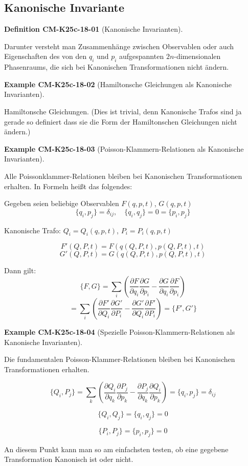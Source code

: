 \documentclass[10pt, letterpaper]{article}
\newcommand{\CustomHeading}[3]{%
  \par\medskip\noindent%
  \textbf{#1 #2} \textnormal{(#3)}.\enskip%
}
\newenvironment{DEF}[2]{\CustomHeading{Definition}{#1}{#2}}{}
\newenvironment{EXA}[2]{\CustomHeading{Example}{#1}{#2}}{}
\begin{document}
\subsection{Kanonische Invariante}

\begin{DEF}{CM-K25c-18-01}{Kanonische Invarianten}
Darunter versteht man Zusammenhänge zwischen Observablen oder auch Eigenschaften des von den $q_i$ und $p_i$ aufgespannten $2n$-dimensionalen Phasenraums, die sich bei Kanonischen Transformationen nicht ändern.
\end{DEF}

\begin{EXA}{CM-K25c-18-02}{Hamiltonsche Gleichungen als Kanonische Invarianten}
Hamiltonsche Gleichungen. (Dies ist trivial, denn Kanonische Trafos sind ja gerade so definiert dass sie die Form der Hamiltonschen Gleichungen nicht ändern.)
\end{EXA}

\begin{EXA}{CM-K25c-18-03}{Poisson-Klammern-Relationen als Kanonische Invarianten}
Alle Poissonklammer-Relationen bleiben bei Kanonischen Transformationen erhalten. In Formeln heißt das folgendes:

Gegeben seien beliebige Observablen $F(q,p,t)$, $G(q,p,t)$
\[
\{q_i, p_j\} = \delta_{ij}, \quad \{q_i, q_j\} = 0 = \{p_i, p_j\}
\]

Kanonische Trafo: $Q_i = Q_i(q,p,t)$, $P_i = P_i(q,p,t)$

\[
F'(Q,P,t) = F(q(Q,P,t), p(Q,P,t), t)
\]
\[
G'(Q,P,t) = G(q(Q,P,t), p(Q,P,t), t)
\]

Dann gilt: $$\{F, G\} = \sum_i \left(\frac{\partial F}{\partial q_i} \frac{\partial G}{\partial p_i} - \frac{\partial G}{\partial q_i} \frac{\partial F}{\partial p_i}\right)$$
\[
= \sum_i \left(\frac{\partial F'}{\partial Q_i} \frac{\partial G'}{\partial P_i} - \frac{\partial G'}{\partial Q_i} \frac{\partial F'}{\partial P_i}\right) = \{F', G'\}
\]
\end{EXA}

\begin{EXA}{CM-K25c-18-04}{Spezielle Poisson-Klammern-Relationen als Kanonische Invarianten}
Die fundamentalen Poisson-Klammer-Relationen bleiben bei Kanonischen Transformationen erhalten.

$$\{Q_i, P_j\} = \sum_k \left(\frac{\partial Q_i}{\partial q_k} \frac{\partial P_j}{\partial p_k} - \frac{\partial P_j}{\partial q_k} \frac{\partial Q_i}{\partial p_k}\right) = \{q_i, p_j\} = \delta_{ij}$$

$$\{Q_i, Q_j\} = \{q_i, q_j\} = 0$$

$$\{P_i, P_j\} = \{p_i, p_j\} = 0$$

An diesem Punkt kann man so am einfachsten testen, ob eine gegebene Transformation Kanonisch ist oder nicht.
\end{EXA}
\end{document}
